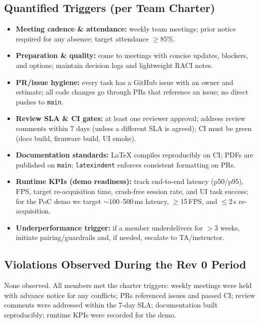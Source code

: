 \documentclass{article}
\begin{document}
\subsection*{Quantified Triggers (per Team Charter)}
\begin{itemize}
  \item \textbf{Meeting cadence \& attendance:} weekly team meetings; prior notice required for any absence; target attendance $\geq$85\%.
  \item \textbf{Preparation \& quality:} come to meetings with concise updates, blockers, and options; maintain decision logs and lightweight RACI notes.
  \item \textbf{PR/issue hygiene:} every task has a GitHub issue with an owner and estimate; all code changes go through PRs that reference an issue; no direct pushes to \texttt{main}.
  \item \textbf{Review SLA \& CI gates:} at least one reviewer approval; address review comments within 7 days (unless a different SLA is agreed); CI must be green (docs build, firmware build, UI smoke).
  \item \textbf{Documentation standards:} LaTeX compiles reproducibly on CI; PDFs are published on \texttt{main}; \texttt{latexindent} enforces consistent formatting on PRs.
  \item \textbf{Runtime KPIs (demo readiness):} track end-to-end latency (p50/p95), FPS, target re-acquisition time, crash-free session rate, and UI task success; for the PoC demo we target $\sim$100--500\,ms latency, $\geq$15\,FPS, and $\leq$2\,s re-acquisition.
  \item \textbf{Underperformance trigger:} if a member underdelivers for $>$3 weeks, initiate pairing/guardrails and, if needed, escalate to TA/instructor.
\end{itemize}

\subsection*{Violations Observed During the Rev 0 Period}
None observed. All members met the charter triggers: weekly meetings were held
with advance notice for any conflicts; PRs referenced issues and passed CI;
review comments were addressed within the 7-day SLA; documentation built
reproducibly; runtime KPIs were recorded for the demo.
\end{document}
